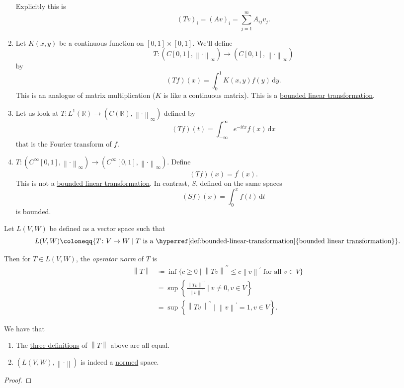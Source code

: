 \begin{eg}
\begin{enumerate}
		      Explicitly this is
		      \[
			      (Tv)_i = (Av)_i = \sum_{j=1}^m A_{ij}v_j.
		      \]
		\item Let \(K(x,y)\) be a continuous function on \([0,1] \times [0,1]\). We'll define
		      \[
			      T \colon (C[0,1],\left\lVert \cdot\right\rVert _\infty) \to (C[0,1], \left\lVert \cdot\right\rVert _\infty)
		      \]
		      by
		      \[
			      (Tf)(x) = \int_0^1 K(x,y)f(y) \,\mathrm{d} y.
		      \]
		      This is an analogue of matrix multiplication (\(K\) is like a continuous matrix). This is a \hyperref[def:bounded-linear-transformation]{bounded linear transformation}.
		\item Let us look at \(T \colon L^1(\mathbb{R}) \to (C(\mathbb{R}),\left\lVert \cdot\right\rVert _\infty)\) defined by
		      \[
			      (Tf)(t) = \int_{-\infty}^\infty e^{-itx}f(x) \,\mathrm{d} x
		      \]
		      that is the Fourier transform of \(f\).
		\item \(T \colon (C^\infty[0,1],\left\lVert \cdot\right\rVert _\infty) \to (C^\infty[0,1], \left\lVert \cdot\right\rVert _\infty)\). Define
		      \[
			      (Tf)(x) = f^\prime (x).
		      \]
		      This is not a \hyperref[def:bounded-linear-transformation]{bounded linear transformation}. In contrast, \(S\), defined on the same spaces
		      \[
			      (Sf)(x) = \int_0^x f(t) \,\mathrm{d} t
		      \]
		      is bounded.
	\end{enumerate}
\end{eg}

\begin{definition}\label{def:operator-norm}
	Let \(L(V, W)\) be defined as a vector space such that
	\[
		L(V,W) \coloneqq \{T \colon V \to W \mid T \text{ is a \hyperref[def:bounded-linear-transformation]{bounded linear transformation}}\}.
	\]

	Then for \(T \in L(V,W)\), the \emph{operator norm} of \(T\) is
	\[
		\begin{split}
			\left\lVert T\right\rVert & \coloneqq \inf\{c \geq 0 \mid \left\lVert Tv\right\rVert^{\prime\prime}  \leq c\left\lVert v\right\rVert^\prime  \text{ for all } v \in V\} \\
			& = \sup\left\{ \frac{\left\lVert Tv\right\rVert^{\prime\prime}}{\left\lVert v\right\rVert^\prime } \mid v \neq 0, v \in V\right\}           \\
			& = \sup\left\{ \left\lVert Tv\right\rVert^{\prime\prime} \mid \left\lVert v\right\rVert^\prime  = 1, v \in V\right\}.
		\end{split}
	\]
\end{definition}

\begin{lemma}
	We have that
	\begin{enumerate}
		\item The \hyperref[def:operator-norm]{three definitions} of \(\left\lVert T\right\rVert\) above are all equal.
		\item \((L(V,W), \left\lVert \cdot\right\rVert )\) is indeed a \hyperref[def:norm]{normed} space.
	\end{enumerate}
\end{lemma}
\begin{proof}
\end{proof}